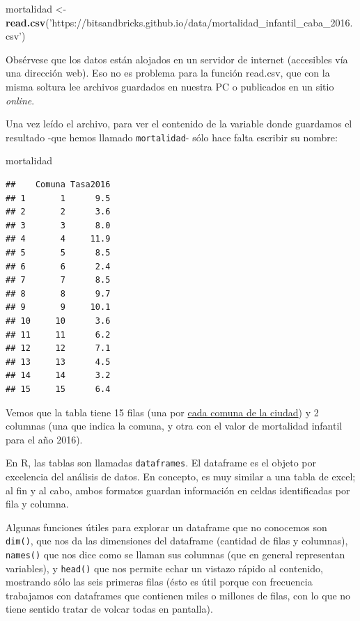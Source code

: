 \documentclass[spanish,]{book}
\newenvironment{Shaded}{\begin{snugshade}}{\end{snugshade}}
\newcommand{\KeywordTok}[1]{\textcolor[rgb]{0.13,0.29,0.53}{\textbf{#1}}}
\newcommand{\NormalTok}[1]{#1}
\newcommand{\StringTok}[1]{\textcolor[rgb]{0.31,0.60,0.02}{#1}}
\begin{document}
\begin{Shaded}
\begin{Highlighting}[]
\NormalTok{mortalidad <-}\StringTok{ }\KeywordTok{read.csv}\NormalTok{(}\StringTok{'https://bitsandbricks.github.io/data/mortalidad_infantil_caba_2016.csv'}\NormalTok{)}
\end{Highlighting}
\end{Shaded}

Obsérvese que los datos están alojados en un servidor de internet (accesibles vía una dirección web). Eso no es problema para la función read.csv, que con la misma soltura lee archivos guardados en nuestra PC o publicados en un sitio \emph{online}.

Una vez leído el archivo, para ver el contenido de la variable donde guardamos el resultado -que hemos llamado \texttt{mortalidad}- sólo hace falta escribir su nombre:

\begin{Shaded}
\begin{Highlighting}[]
\NormalTok{mortalidad}
\end{Highlighting}
\end{Shaded}

\begin{verbatim}
##    Comuna Tasa2016
## 1       1      9.5
## 2       2      3.6
## 3       3      8.0
## 4       4     11.9
## 5       5      8.5
## 6       6      2.4
## 7       7      8.5
## 8       8      9.7
## 9       9     10.1
## 10     10      3.6
## 11     11      6.2
## 12     12      7.1
## 13     13      4.5
## 14     14      3.2
## 15     15      6.4
\end{verbatim}

Vemos que la tabla tiene 15 filas (una por \href{https://es.wikipedia.org/wiki/Comunas_de_la_ciudad_de_Buenos_Aires}{cada comuna de la ciudad}) y 2 columnas (una que indica la comuna, y otra con el valor de mortalidad infantil para el año 2016).

En R, las tablas son llamadas \texttt{dataframes}. El dataframe es el objeto por excelencia del análisis de datos. En concepto, es muy similar a una tabla de excel; al fin y al cabo, ambos formatos guardan información en celdas identificadas por fila y columna.

Algunas funciones útiles para explorar un dataframe que no conocemos son \texttt{dim()}, que nos da las dimensiones del dataframe (cantidad de filas y columnas), \texttt{names()} que nos dice como se llaman sus columnas (que en general representan variables), y \texttt{head()} que nos permite echar un vistazo rápido al contenido, mostrando sólo las seis primeras filas (ésto es útil porque con frecuencia trabajamos con dataframes que contienen miles o millones de filas, con lo que no tiene sentido tratar de volcar todas en pantalla).
\end{document}
